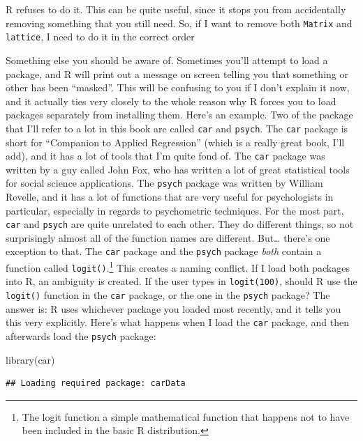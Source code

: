 \documentclass[
]{book}
\newenvironment{Shaded}{\begin{snugshade}}{\end{snugshade}}
\newcommand{\FunctionTok}[1]{\textcolor[rgb]{0.00,0.00,0.00}{#1}}
\newcommand{\NormalTok}[1]{#1}
\begin{document}
R refuses to do it. This can be quite useful, since it stops you from accidentally removing something that you still need. So, if I want to remove both \texttt{Matrix} and \texttt{lattice}, I need to do it in the correct order

Something else you should be aware of. Sometimes you'll attempt to load a package, and R will print out a message on screen telling you that something or other has been ``masked''. This will be confusing to you if I don't explain it now, and it actually ties very closely to the whole reason why R forces you to load packages separately from installing them. Here's an example. Two of the package that I'll refer to a lot in this book are called \texttt{car} and \texttt{psych}. The \texttt{car} package is short for ``Companion to Applied Regression'' (which is a really great book, I'll add), and it has a lot of tools that I'm quite fond of. The \texttt{car} package was written by a guy called John Fox, who has written a lot of great statistical tools for social science applications. The \texttt{psych} package was written by William Revelle, and it has a lot of functions that are very useful for psychologists in particular, especially in regards to psychometric techniques. For the most part, \texttt{car} and \texttt{psych} are quite unrelated to each other. They do different things, so not surprisingly almost all of the function names are different. But\ldots{} there's one exception to that. The \texttt{car} package and the \texttt{psych} package \emph{both} contain a function called \texttt{logit()}.\footnote{The logit function a simple mathematical function that happens not to have been included in the basic R distribution.} This creates a naming conflict. If I load both packages into R, an ambiguity is created. If the user types in \texttt{logit(100)}, should R use the \texttt{logit()} function in the \texttt{car} package, or the one in the \texttt{psych} package? The answer is: R uses whichever package you loaded most recently, and it tells you this very explicitly. Here's what happens when I load the \texttt{car} package, and then afterwards load the \texttt{psych} package:

\begin{Shaded}
\begin{Highlighting}[]
\FunctionTok{library}\NormalTok{(car)}
\end{Highlighting}
\end{Shaded}

\begin{verbatim}
## Loading required package: carData
\end{verbatim}
\end{document}
